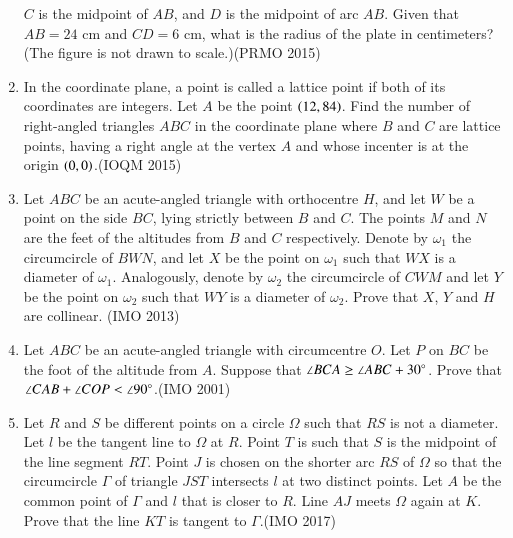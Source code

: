 \begin{enumerate}[label=\thesubsection.\arabic*,ref=\thesubsection.\theenumi]
    $ C $ is the midpoint of $ AB $, and $ D $ is the midpoint of arc $ AB $. Given that $ AB = 24 $ cm and $ CD = 6 $ cm, what is the radius of the plate in centimeters? (The figure is not drawn to scale.)\hfill(PRMO 2015)
    \item In the coordinate plane, a point is called a lattice point if both of its coordinates are integers. Let $A$ be the point $\left(12, 84\right)$. Find the number of right-angled triangles $ABC$ in the coordinate plane where $B$ and $C$ are lattice points, having a right angle at the vertex $A$ and whose incenter is at the origin $\left(0, 0\right)$.\hfill(IOQM 2015)
\item Let $ABC$ be an acute-angled triangle with orthocentre $H$, and let $W$ be a point on the side $BC$, lying strictly between $B$ and $C$. The points $M$ and $N$ are the feet of the altitudes from $B$ and $C$ respectively. Denote by $\omega_1$ the circumcircle of $BWN$, and let $X$ be the point on $\omega_1$ such that $WX$ is a diameter of $\omega_1$. Analogously, denote by $\omega_2$ the circumcircle of $CWM$ and let $Y$ be the point on $\omega_2$ such that $WY$ is a diameter of $\omega_2$. Prove that $X$, $Y$ and $H$ are collinear. \hfill(IMO  2013)
\item Let $ABC$ be an acute-angled triangle with circumcentre $O$. Let $P$ on $BC$ be the foot of the altitude from $A$. Suppose that $\angle BC A\geq \angle ABC+30\degree$. Prove that $\angle CAB+\angle COP < \angle 90\degree$.\hfill(IMO 2001)
\item Let $R$ and $S$ be different points on a circle $\Omega$ such that $RS$ is not a diameter. Let $l$ be the tangent line to $\Omega$ at $R$. Point $T$ is such that $S$ is the midpoint of the line segment $RT$. Point $J$ is chosen on the shorter arc $RS$ of $\Omega$ so that the circumcircle $\Gamma$ of triangle $JST$ intersects $l$ at two distinct points. Let $A$ be the common point of $\Gamma$ and $l$ that is closer to $R$. Line $AJ$ meets $\Omega$ again at $K$. Prove that the line $KT$ is tangent to $\Gamma$.\hfill (IMO  2017)
\end{enumerate}
